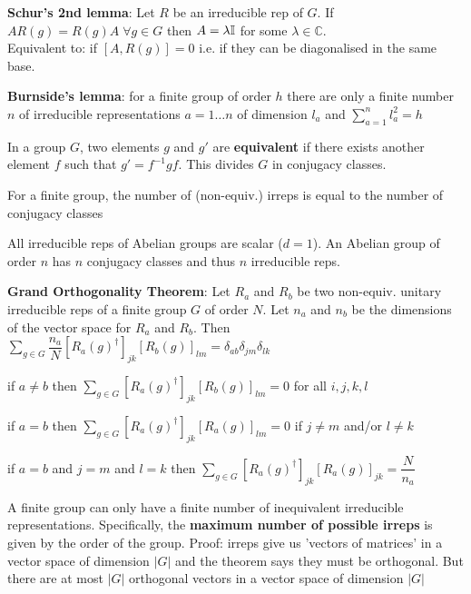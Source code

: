 \begin{squishlist}
    \item \textbf{Schur's 2nd lemma}: Let $R$ be an irreducible rep of $G$. If $A R(g) = R(g) A \; \forall g \in G$ then $A = \lambda \mathbb{I} $ for some $\lambda \in \mathbb{C}$. \\
    Equivalent to: if $[A,R(g)] = 0$ i.e. if they can be diagonalised in the same base.
    
    \item \textbf{Burnside's lemma}: for a finite group of order $h$ there are only a finite number $n$ of irreducible representations $a = 1 \ldots n$ of dimension $l_a$ and $\sum_{a=1}^n l_a^2 = h$
    \item In a group $G$, two elements $g$ and $g'$ are \textbf{equivalent} if there exists another element $f$ such that $g' = f^{-1} g f$. This divides $G$ in conjugacy classes.
    \item For a finite group, the number of (non-equiv.) irreps is equal to the number of conjugacy classes
    \item All irreducible reps of Abelian groups are scalar ($d=1$). An Abelian group of order $n$ has $n$ conjugacy classes and thus $n$ irreducible reps.
    
    \item \textbf{Grand Orthogonality Theorem}: Let $R_a$ and $R_b$ be two non-equiv. unitary irreducible reps of a finite group $G$ of order $N$.
    Let $n_a$ and $n_b$ be the dimensions of the vector space for $R_a$ and $R_b$. Then \\
    $\sum_{g\in G} \dfrac{n_a}{N} \left[R_a(g)^{\dagger}\right]_{jk} \left[R_b(g)\right]_{lm} = \delta_{ab} \delta_{jm} \delta_{lk}$
    \begin{squishitemize}
        \item if $a \neq b$ then $\sum_{g\in G} \left[R_a(g)^{\dagger}\right]_{jk} \left[R_b(g)\right]_{lm} = 0$ for all $i,j,k,l$
        \item if $a = b$ then $\sum_{g\in G} \left[R_a(g)^{\dagger}\right]_{jk} \left[R_a(g)\right]_{lm} = 0$ if $j \neq m$ and/or $l \neq k$
        \item if $a=b$ and $j=m$ and $l=k$ then $\sum_{g\in G} \left[R_a(g)^{\dagger}\right]_{jk} \left[R_a(g)\right]_{jk} = \dfrac{N}{n_a}$
    \end{squishitemize}

    \item A finite group can only have a finite number of inequivalent irreducible
    representations. Specifically, the \textbf{maximum number of possible irreps} is given by the order of the group.
    Proof: irreps give us 'vectors of matrices' in a vector space of dimension $|G|$ and the theorem says they must be orthogonal. But there are at most $|G|$ orthogonal vectors in a vector space of dimension $|G|$


\end{squishlist}
